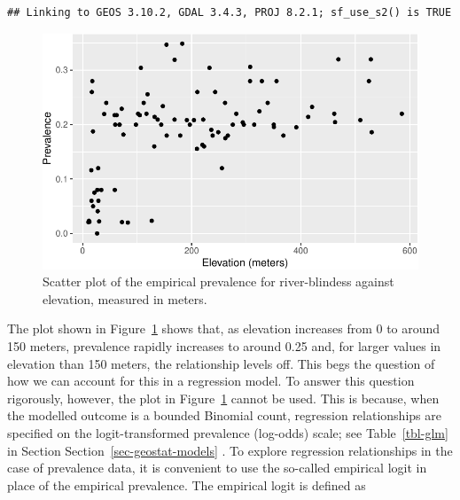 \documentclass[
  letterpaper,
]{krantz}
\newenvironment{Shaded}{\begin{snugshade}}{\end{snugshade}}
\newcommand{\AttributeTok}[1]{\textcolor[rgb]{0.40,0.45,0.13}{#1}}
\newcommand{\FunctionTok}[1]{\textcolor[rgb]{0.28,0.35,0.67}{#1}}
\newcommand{\NormalTok}[1]{\textcolor[rgb]{0.00,0.23,0.31}{#1}}
\newcommand{\OtherTok}[1]{\textcolor[rgb]{0.00,0.23,0.31}{#1}}
\newcommand{\SpecialCharTok}[1]{\textcolor[rgb]{0.37,0.37,0.37}{#1}}
\newcommand{\StringTok}[1]{\textcolor[rgb]{0.13,0.47,0.30}{#1}}
\begin{document}
\begin{verbatim}
## Linking to GEOS 3.10.2, GDAL 3.4.3, PROJ 8.2.1; sf_use_s2() is TRUE
\end{verbatim}

\begin{Shaded}
\end{Shaded}

\begin{figure}[H]

{\centering \includegraphics{03_model-fitting_files/figure-pdf/fig-prev-elev-liberia-1.pdf}

}

\caption{\label{fig-prev-elev-liberia}Scatter plot of the empirical
prevalence for river-blindess against elevation, measured in meters.}

\end{figure}

The plot shown in Figure~\ref{fig-prev-elev-liberia} shows that, as
elevation increases from 0 to around 150 meters, prevalence rapidly
increases to around 0.25 and, for larger values in elevation than 150
meters, the relationship levels off. This begs the question of how we
can account for this in a regression model. To answer this question
rigorously, however, the plot in Figure~\ref{fig-prev-elev-liberia}
cannot be used. This is because, when the modelled outcome is a bounded
Binomial count, regression relationships are specified on the
logit-transformed prevalence (log-odds) scale; see Table~\ref{tbl-glm}
in Section Section~\ref{sec-geostat-models} . To explore regression
relationships in the case of prevalence data, it is convenient to use
the so-called empirical logit in place of the empirical prevalence. The
empirical logit is defined as
\end{document}
